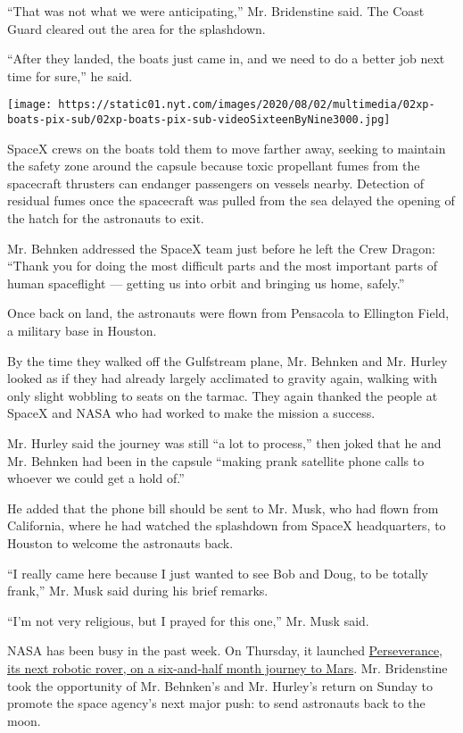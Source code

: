 ``That was not what we were anticipating,'' Mr. Bridenstine said. The
Coast Guard cleared out the area for the splashdown.

``After they landed, the boats just came in, and we need to do a better
job next time for sure,'' he said.

\texttt{[image: https://static01.nyt.com/images/2020/08/02/multimedia/02xp-boats-pix-sub/02xp-boats-pix-sub-videoSixteenByNine3000.jpg]}

SpaceX crews on the boats told them to move farther away, seeking to
maintain the safety zone around the capsule because toxic propellant
fumes from the spacecraft thrusters can endanger passengers on vessels
nearby. Detection of residual fumes once the spacecraft was pulled from
the sea delayed the opening of the hatch for the astronauts to exit.

Mr. Behnken addressed the SpaceX team just before he left the Crew
Dragon: ``Thank you for doing the most difficult parts and the most
important parts of human spaceflight --- getting us into orbit and
bringing us home, safely.''

Once back on land, the astronauts were flown from Pensacola to Ellington
Field, a military base in Houston.

By the time they walked off the Gulfstream plane, Mr. Behnken and Mr.
Hurley looked as if they had already largely acclimated to gravity
again, walking with only slight wobbling to seats on the tarmac. They
again thanked the people at SpaceX and NASA who had worked to make the
mission a success.

Mr. Hurley said the journey was still ``a lot to process,'' then joked
that he and Mr. Behnken had been in the capsule ``making prank satellite
phone calls to whoever we could get a hold of.''

He added that the phone bill should be sent to Mr. Musk, who had flown
from California, where he had watched the splashdown from SpaceX
headquarters, to Houston to welcome the astronauts back.

``I really came here because I just wanted to see Bob and Doug, to be
totally frank,'' Mr. Musk said during his brief remarks.

``I'm not very religious, but I prayed for this one,'' Mr. Musk said.

NASA has been busy in the past week. On Thursday, it launched
\href{https://www.nytimes.com/2020/07/30/science/nasa-mars-launch.html}{Perseverance,
its next robotic rover, on a six-and-half month journey to Mars}. Mr.
Bridenstine took the opportunity of Mr. Behnken's and Mr. Hurley's
return on Sunday to promote the space agency's next major push: to send
astronauts back to the moon.

